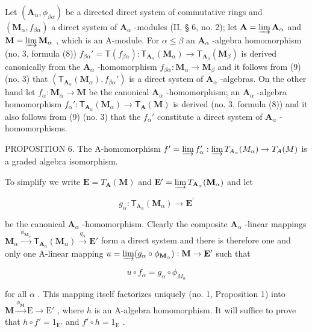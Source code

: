 Let \((\mathbf{A}_{\alpha},\phi_{\beta \alpha})\) be a directed direct system of commutative rings and \((\mathbf{M}_{\alpha},f_{\beta \alpha})\) a direct system of \(\mathbf{A}_{\alpha}\) -modules (II, § 6, no. 2); let \(\mathbf{A} = \varinjlim \mathbf{A}_{\alpha}\) and \(\mathbf{M} = \varinjlim \mathbf{M}_{\alpha}\) , which is an A-module. For \(\alpha \leqslant \beta\) an \(\mathbf{A}_{\alpha}\) -algebra homomorphism (no. 3, formula (8)) \(f_{\beta \alpha}' = \mathsf{T}(f_{\beta \alpha})\colon \mathsf{T}_{\mathbf{A}_{\alpha}}(\mathbf{M}_{\alpha})\to \mathsf{T}_{\mathbf{A}_{\beta}}(\mathbf{M}_{\beta})\) is derived canonically from the \(\mathbf{A}_{\alpha}\) -homomorphism \(f_{\beta \alpha}\colon \mathbf{M}_{\alpha}\to \mathbf{M}_{\beta}\) and it follows from (9) (no. 3) that \((\mathsf{T}_{\mathbf{A}_{\alpha}}(\mathbf{M}_{\alpha}),f_{\beta \alpha}')\) is a direct system of \(\mathbf{A}_{\alpha}\) -algebras. On the other hand let \(f_{\alpha}\colon \mathbf{M}_{\alpha}\to \mathbf{M}\) be the canonical \(\mathbf{A}_{\alpha}\) -homomorphism; an \(\mathbf{A}_{\alpha}\) -algebra homomorphism \(f_{\alpha}'\colon \mathsf{T}_{\mathbf{A}_{\alpha}}(\mathbf{M}_{\alpha})\to \mathsf{T}_{\mathbf{A}}(\mathbf{M})\) is derived (no. 3, formula (8)) and it also follows from (9) (no. 3) that the \(f_{\alpha}'\) constitute a direct system of \(\mathbf{A}_{\alpha}\) -homomorphisms.

PROPOSITION 6. The A-homomorphism \(f' = \varinjlim f_{\alpha}' : \varinjlim T_{A_{\alpha}}(M_{\alpha}) \to T_{A}(M)\) is a graded algebra isomorphism.

To simplify we write \(\mathbf{E} = T_{\mathbf{A}}(\mathbf{M})\) and \(\mathbf{E}' = \varinjlim T_{\mathbf{A}_{\alpha}}(\mathbf{M}_{\alpha})\) and let

\[
g _ {\alpha}: \mathsf {T} _ {\mathrm{A} _ {\alpha}} (\mathbf {M} _ {\alpha}) \rightarrow \mathbf {E} ^ {\prime}
\]

be the canonical \(\mathbf{A}_{\alpha}\) -homomorphism. Clearly the composite \(\mathbf{A}_{\alpha}\) -linear mappings \(\mathbf{M}_{\alpha} \xrightarrow{\phi_{\mathbf{M}_{\alpha}}} \mathsf{T}_{\mathbf{A}_{\alpha}}(\mathbf{M}_{\alpha}) \xrightarrow{g_{\alpha}} \mathbf{E}'\) form a direct system and there is therefore one and only one A-linear mapping \(u = \varinjlim (g_{\alpha} \circ \phi_{\mathbf{M}_{\alpha}}): \mathbf{M} \to \mathbf{E}'\) such that

\[
u \circ f _ {\alpha} = g _ {\alpha} \circ \phi_ {M _ {\alpha}}
\]

for all \(\alpha\) . This mapping itself factorizes uniquely (no. 1, Proposition 1) into \(\mathbf{M} \xrightarrow{\phi_{\mathbf{M}}} \mathrm{E} \to \mathrm{E}'\) , where \(h\) is an A-algebra homomorphism. It will suffice to prove that \(h \circ f' = 1_{\mathrm{E}'}\) and \(f' \circ h = 1_{\mathrm{E}}\) .

